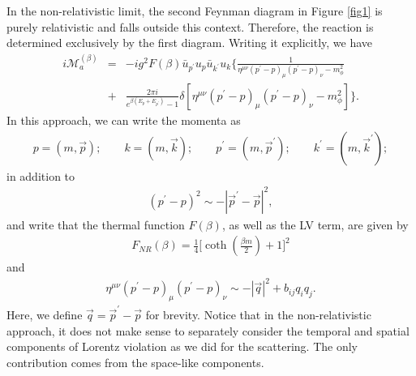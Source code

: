 \documentclass[11pt,showpacs,preprintnumbers,amsmath,amssymb,prd,nofootinbib,superscriptaddress]{revtex4-2}
\begin{document}
{In the non-relativistic limit, the second Feynman diagram in Figure \ref{fig1} is purely relativistic and falls outside this context. Therefore, the reaction is determined exclusively by the first diagram. Writing it explicitly, we have
\begin{eqnarray}
    i\mathcal{M}_{a}^{(\beta)}&=&-ig^2F(\beta)\bar{u}_{p^\prime}u_p\bar{u}_{k^\prime}u_k\biggl\{\frac{1}{\eta^{\mu\nu}(p^\prime-p)_\mu(p^\prime-p)_\nu-m_{\phi}^2}\nonumber\\&+&\frac{2\pi i}{e^{\beta (E_{p}+E_{p^\prime})}-1}\delta[\eta^{\mu\nu}(p^\prime-p)_\mu(p^\prime-p)_\nu-m_\phi^2]\biggr\}.
\end{eqnarray}
In this approach, we can write the momenta as
\begin{eqnarray}
    p=(m,\vec{p});\quad\quad k=(m,\vec{k});\quad\quad p^\prime=(m,\vec{p}^\prime);\quad\quad k^\prime=(m,\vec{k}^\prime);\label{eq05}
\end{eqnarray}
in addition to
\begin{eqnarray}
    (p^\prime-p)^2\sim -|\vec{p}^\prime-\vec{p}|^2,\label{eq06}
\end{eqnarray}
and write that the thermal function $F(\beta)$, as well as the LV term, are given by
\begin{eqnarray}
    F_{NR}(\beta)=\frac{1}{4}\biggr[\coth{\left(\frac{\beta m}{2}\right)}+1\biggl]^2
\end{eqnarray}
and
\begin{eqnarray}
    \eta^{\mu\nu}(p^\prime-p)_\mu(p^\prime-p)_\nu\sim -|\vec{q}|^2+b_{ij}q_iq_j.
\end{eqnarray}
Here, we define $\vec{q}=\vec{p}^\prime-\vec{p}$ for brevity. Notice that in the non-relativistic approach, it does not make sense to separately consider the temporal and spatial components of Lorentz violation as we did for the scattering. The only contribution comes from the space-like components.

}
\end{document}
